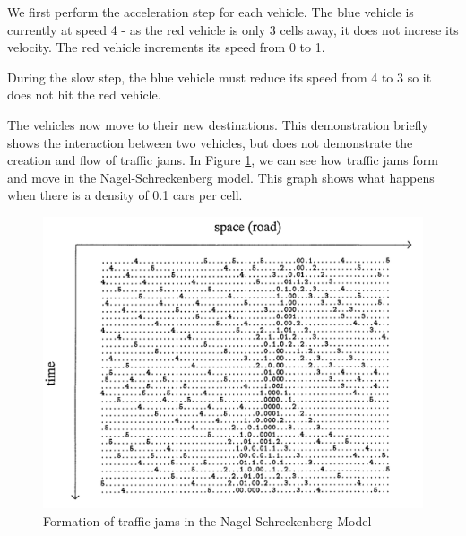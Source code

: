 \documentclass[ %
                    author={Alexander Hill},
                supervisor={Dr. Benjamin Sach},
                    degree={MEng},
                     title={MARMOSET},
                  subtitle={Multi-Agent Route Management using Online Simulation for Efficient Transportation},
                      type={research},
                      year={2016} ]{dissertation}
\begin{document}
\begin{figure}[!h]
\centering
{}
\end{figure}

We first perform the acceleration step for each vehicle. The blue vehicle
is currently at speed 4 - as the red vehicle is only 3 cells away, it does
not increse its velocity. The red vehicle increments its speed from 0 to 1.

During the slow step, the blue vehicle must reduce its speed from 4 to 3
so it does not hit the red vehicle.

\begin{figure}[!h]
\centering
{}
\end{figure}

The vehicles now move to their new destinations. This demonstration briefly
shows the interaction between two vehicles, but does not demonstrate the
creation and flow of traffic jams. In Figure \ref{nagel-demo}, we can see how
traffic jams form and move in the Nagel-Schreckenberg model. This graph shows
what happens when there is a density of 0.1 cars per cell.

\begin{figure}[h]
    \centering
    \includegraphics[scale=0.4]{nagel}
    \caption{Formation of traffic jams in the Nagel-Schreckenberg Model}\label{nagel-demo}
\end{figure}
\end{document}
